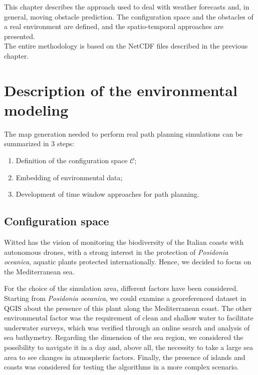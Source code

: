 \label{approach}

This chapter describes the approach used to deal with weather forecasts and, in general, moving obstacle prediction. The configuration space and the obstacles of a real environment are defined, and the spatio-temporal approaches are presented.\\
The entire methodology is based on the NetCDF files described in the previous chapter. 
\section{Description of the environmental modeling}
The map generation needed to perform real path planning simulations can be summarized in 3 steps:
\begin{enumerate}[itemsep=0pt]
	\item Definition of the configuration space $\mathcal{C}$;
	\item Embedding of environmental data;
	\item Development of time window approaches for path planning.
\end{enumerate}
\subsection{Configuration space}
Witted has the vision of monitoring the biodiversity of the Italian coasts with autonomous drones, with a strong interest in the protection of \textit{Posidonia oceanica}, aquatic plants protected internationally. Hence, we decided to focus on the Mediterranean sea.

For the choice of the simulation area, different factors have been considered. Starting from \textit{Posidonia oceanica}, we could examine a georeferenced dataset in QGIS about the presence of this plant along the Mediterranean coast. The other environmental factor was the requirement of clean and shallow water to facilitate underwater surveys, which was verified through an online search and analysis of sea bathymetry.
Regarding the dimension of the sea region, we considered the possibility to navigate it in a day and, above all, the necessity to take a large sea area to see changes in atmospheric factors. Finally, the presence of islands and coasts was considered for testing the algorithms in a more complex scenario.     

